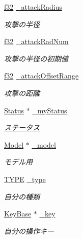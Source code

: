\begin{DoxyCompactItemize}
\hyperlink{_main_8h_a5f6906312a689f27d70e9d086649d3fd}{f32} \hyperlink{class_man_a132be4c780976f644274832498b3e84e}{\-\_\-attack\-Radius}
\begin{DoxyCompactList}\small\item\em 攻撃の半径 \end{DoxyCompactList}\item 
\hyperlink{_main_8h_a5f6906312a689f27d70e9d086649d3fd}{f32} \hyperlink{class_man_a3479373b377a9d008410d94e16112897}{\-\_\-attack\-Rad\-Num}
\begin{DoxyCompactList}\small\item\em 攻撃の半径の初期値 \end{DoxyCompactList}\item 
\hyperlink{_main_8h_a5f6906312a689f27d70e9d086649d3fd}{f32} \hyperlink{class_man_aef1a7ce26d3f34dc162e49a392df1088}{\-\_\-attack\-Offset\-Range}
\begin{DoxyCompactList}\small\item\em 攻撃の距離 \end{DoxyCompactList}\item 
\hyperlink{struct_status}{Status} $\ast$ \hyperlink{class_man_ae884f4872be46582eac86e05d47ac52f}{\-\_\-my\-Status}
\begin{DoxyCompactList}\small\item\em \hyperlink{struct_xE3_x82_xB9_xE3_x83_x86_xE3_x83_xBC_xE3_x82_xBF_xE3_x82_xB9}{ステータス} \end{DoxyCompactList}\item 
\hyperlink{class_model}{Model} $\ast$ \hyperlink{class_man_a0e9a8437e880e5bc17ca83a89b0a716d}{\-\_\-model}
\begin{DoxyCompactList}\small\item\em モデル用 \end{DoxyCompactList}\item 
\hyperlink{class_man_af2f4c50db54b697f45e30dd4161d0d7c}{T\-Y\-P\-E} \hyperlink{class_man_abd30d75b28d7c06673a676c6d7f8c36e}{\-\_\-type}
\begin{DoxyCompactList}\small\item\em 自分の種類 \end{DoxyCompactList}\item 
\hyperlink{class_key_base}{Key\-Base} $\ast$ \hyperlink{class_man_ac2efd76a0685583f4faad618b4961542}{\-\_\-key}
\begin{DoxyCompactList}\small\item\em 自分の操作キー \end{DoxyCompactList}\item 

\end{DoxyCompactItemize}
